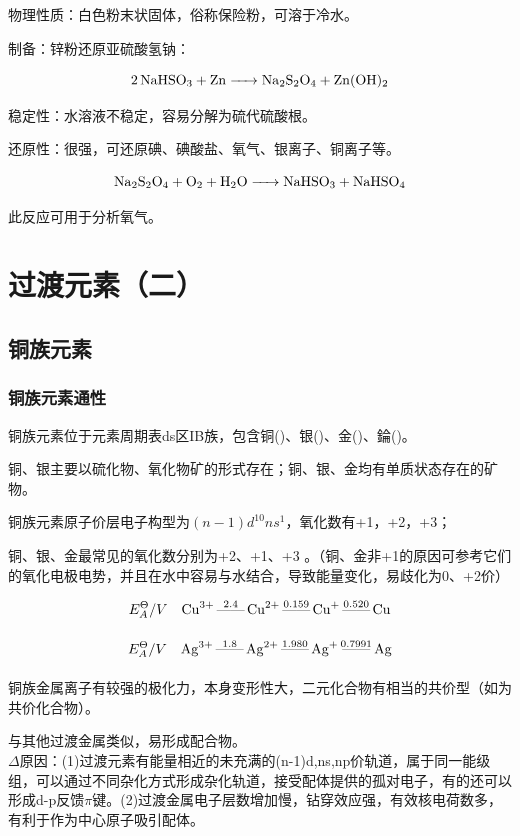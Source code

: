 \documentclass[a4paper,UTF8]{article}
\begin{document}
物理性质：白色粉末状固体，俗称保险粉，可溶于冷水。

制备：锌粉还原亚硫酸氢钠：

$$ \ce{2NaHSO3 + Zn -> Na2S2O4 + Zn(OH)2} $$

稳定性：水溶液不稳定，容易分解为硫代硫酸根。

还原性：很强，可还原碘、碘酸盐、氧气、银离子、铜离子等。

$$ \ce{Na2S2O4 + O2 + H2O -> NaHSO3 + NaHSO4} $$

此反应可用于分析氧气。




\section{过渡元素（二）}

\subsection{铜族元素}

\subsubsection{铜族元素通性}

铜族元素位于元素周期表ds区IB族，包含铜()、银()、金()、錀()。

铜、银主要以硫化物、氧化物矿的形式存在；铜、银、金均有单质状态存在的矿物。

铜族元素原子价层电子构型为$(n-1)d^{10}ns^{1}$，氧化数有+1，+2，+3；

铜、银、金最常见的氧化数分别为+2、+1、+3 。（铜、金非+1的原因可参考它们的氧化电极电势，并且在水中容易与水结合，导致能量变化，易歧化为0、+2价）

$$ E^{\Theta}_{A}/V \quad \ce{Cu^{3+} \overset{2.4}{\text{------}} Cu^{2+} \overset{0.159}{\underset{}{\text{------}}} Cu+ \overset{0.520}{\underset{}{\text{------}}} Cu}$$

$$ E^{\Theta}_{A}/V  \quad \ce{Ag^{3+} \overset{1.8}{\underset{}{\text{------}}} Ag^{2+} \overset{1.980}{\underset{}{\text{------}}} Ag+ \overset{0.7991}{\underset{}{\text{------}}} Ag} $$




铜族金属离子有较强的极化力，本身变形性大，二元化合物有相当的共价型（如为共价化合物）。

与其他过渡金属类似，易形成配合物。\\$\Delta$原因：(1)过渡元素有能量相近的未充满的(n-1)d,ns,np价轨道，属于同一能级组，可以通过不同杂化方式形成杂化轨道，接受配体提供的孤对电子，有的还可以形成d-p反馈$\pi$键。(2)过渡金属电子层数增加慢，钻穿效应强，有效核电荷数多，有利于作为中心原子吸引配体。
\end{document}
